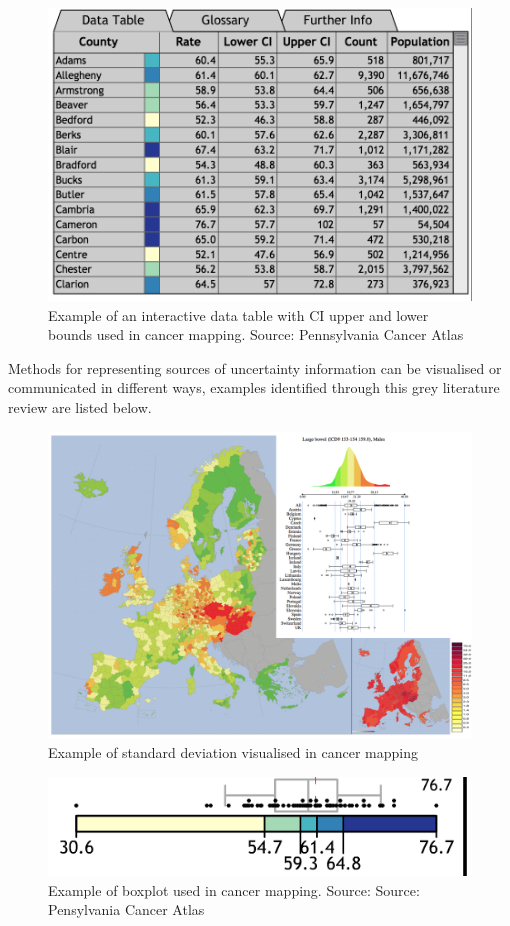 \documentclass[11pt,]{article}
\begin{document}
\begin{figure}

{\centering \includegraphics[width=0.5\linewidth]{figures/uncert_table} 

}

\caption{Example of an interactive data table with CI upper and lower bounds used in cancer mapping. Source: Pennsylvania Cancer Atlas}\label{fig:ci-table}
\end{figure}

Methods for representing sources of uncertainty information can be
visualised or communicated in different ways, examples identified
through this grey literature review are listed below.

\begin{figure}

{\centering \includegraphics[width=0.9\linewidth]{figures/standard_deviation_large} 

}

\caption{Example of standard deviation visualised in cancer mapping}\label{fig:stndvn-example}
\end{figure}

\begin{figure}

{\centering \includegraphics[width=0.4\linewidth]{figures/Boxplot2} 

}

\caption{Example of boxplot used in cancer mapping. Source: Source: Pensylvania Cancer Atlas }\label{fig:boxplot-example}
\end{figure}
\end{document}
